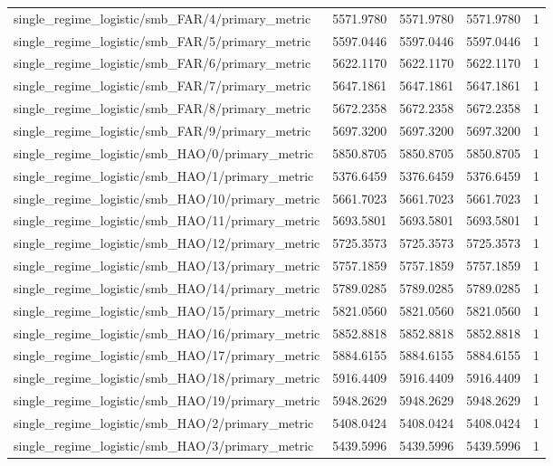 \begin{table}[h]
\begin{tabular}{lrrrr}
single_regime_logistic/smb_FAR/4/primary_metric & 5571.9780 & 5571.9780 & 5571.9780 & 1 \\
single_regime_logistic/smb_FAR/5/primary_metric & 5597.0446 & 5597.0446 & 5597.0446 & 1 \\
single_regime_logistic/smb_FAR/6/primary_metric & 5622.1170 & 5622.1170 & 5622.1170 & 1 \\
single_regime_logistic/smb_FAR/7/primary_metric & 5647.1861 & 5647.1861 & 5647.1861 & 1 \\
single_regime_logistic/smb_FAR/8/primary_metric & 5672.2358 & 5672.2358 & 5672.2358 & 1 \\
single_regime_logistic/smb_FAR/9/primary_metric & 5697.3200 & 5697.3200 & 5697.3200 & 1 \\
single_regime_logistic/smb_HAO/0/primary_metric & 5850.8705 & 5850.8705 & 5850.8705 & 1 \\
single_regime_logistic/smb_HAO/1/primary_metric & 5376.6459 & 5376.6459 & 5376.6459 & 1 \\
single_regime_logistic/smb_HAO/10/primary_metric & 5661.7023 & 5661.7023 & 5661.7023 & 1 \\
single_regime_logistic/smb_HAO/11/primary_metric & 5693.5801 & 5693.5801 & 5693.5801 & 1 \\
single_regime_logistic/smb_HAO/12/primary_metric & 5725.3573 & 5725.3573 & 5725.3573 & 1 \\
single_regime_logistic/smb_HAO/13/primary_metric & 5757.1859 & 5757.1859 & 5757.1859 & 1 \\
single_regime_logistic/smb_HAO/14/primary_metric & 5789.0285 & 5789.0285 & 5789.0285 & 1 \\
single_regime_logistic/smb_HAO/15/primary_metric & 5821.0560 & 5821.0560 & 5821.0560 & 1 \\
single_regime_logistic/smb_HAO/16/primary_metric & 5852.8818 & 5852.8818 & 5852.8818 & 1 \\
single_regime_logistic/smb_HAO/17/primary_metric & 5884.6155 & 5884.6155 & 5884.6155 & 1 \\
single_regime_logistic/smb_HAO/18/primary_metric & 5916.4409 & 5916.4409 & 5916.4409 & 1 \\
single_regime_logistic/smb_HAO/19/primary_metric & 5948.2629 & 5948.2629 & 5948.2629 & 1 \\
single_regime_logistic/smb_HAO/2/primary_metric & 5408.0424 & 5408.0424 & 5408.0424 & 1 \\
single_regime_logistic/smb_HAO/3/primary_metric & 5439.5996 & 5439.5996 & 5439.5996 & 1 \\

\end{tabular}
\end{table}
